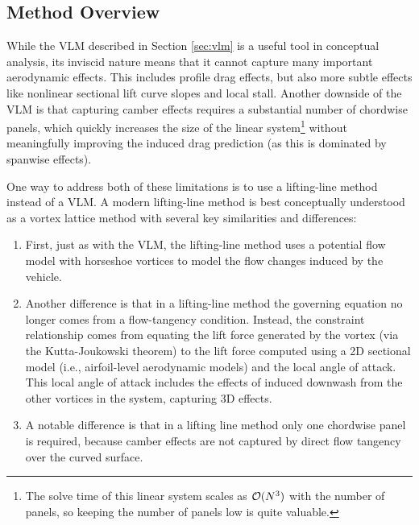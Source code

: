 \subsection{Method Overview}

While the VLM described in Section \ref{sec:vlm} is a useful tool in conceptual analysis, its inviscid nature means that it cannot capture many important aerodynamic effects. This includes profile drag effects, but also more subtle effects like nonlinear sectional lift curve slopes and local stall. Another downside of the VLM is that capturing camber effects requires a substantial number of chordwise panels, which quickly increases the size of the linear system\footnote{The solve time of this linear system scales as $\mathcal{O}(N^3)$ with the number of panels, so keeping the number of panels low is quite valuable.} without meaningfully improving the induced drag prediction (as this is dominated by spanwise effects).

One way to address both of these limitations is to use a lifting-line method instead of a VLM. A modern lifting-line method is best conceptually understood as a vortex lattice method with several key similarities and differences:
\begin{enumerate}
    \item First, just as with the VLM, the lifting-line method uses a potential flow model with horseshoe vortices to model the flow changes induced by the vehicle.
    \item Another difference is that in a lifting-line method the governing equation no longer comes from a flow-tangency condition. Instead, the constraint relationship comes from equating the lift force generated by the vortex (via the Kutta-Joukowski theorem) to the lift force computed using a 2D sectional model (i.e., airfoil-level aerodynamic models) and the local angle of attack. This local angle of attack includes the effects of induced downwash from the other vortices in the system, capturing 3D effects.
    \item A notable difference is that in a lifting line method only one chordwise panel is required, because camber effects are not captured by direct flow tangency over the curved surface.
\end{enumerate}

